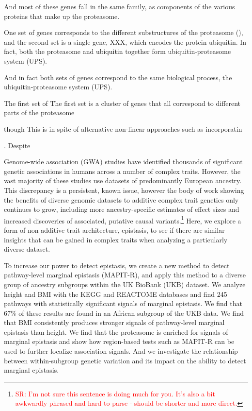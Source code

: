 \documentclass[12pt,a4paper]{article}
\newcommand{\red}[1]{\textcolor{red}{#1}}
\begin{document}
And most of these genes fall in the same family, as components of the various proteins that make up the proteasome. 

One set of genes corresponds to the different substructures of the proteasome (), and the second set is a single gene, XXX, which encodes the protein ubiquitin. In fact, both the proteasome and ubiquitin together form ubiquitin-proteasome system (UPS).



And in fact both sets of genes correspond to the same biological process, the ubiquitin-proteasome system (UPS).

The first set of The first set is a cluster of genes that all correspond to different parts of the proteasome







though  
This is in spite of alternative non-linear approaches such as incorporatin

. Despite 




Genome-wide association (GWA) studies have identified thousands of significant genetic associations in humans across a number of complex traits. However, the vast majority of these studies use datasets of predominantly European ancestry. This discrepancy is a persistent, known issue, however the body of work showing the benefits of diverse genomic datasets to additive complex trait genetics only continues to grow, including more ancestry-specific estimates of effect sizes and increased discoveries of associated, putative causal variants.\footnote{\red{SR: I'm not sure this sentence is doing much for you. It's also a bit awkwardly phrased and hard to parse - should be shorter and more direct.}} Here, we explore a form of non-additive trait architecture, epistasis, to see if there are similar insights that can be gained in complex traits when analyzing a particularly diverse dataset. 

To increase our power to detect epistasis, we create a new method to detect pathway-level marginal epistasis (MAPIT-R), and apply this method to a diverse group of ancestry subgroups within the UK BioBank (UKB) dataset. We analyze height and BMI with the KEGG and REACTOME databases and find 245 pathways with statistically significant signals of marginal epistasis. We find that 67\% of these results are found in an African subgroup of the UKB data. We find that BMI consistently produces stronger signals of pathway-level marginal epistasis than height. We find that the proteasome is enriched for signals of marginal epistasis and show how region-based tests such as MAPIT-R can be used to further localize association signals. And we investigate the relationship between within-subgroup genetic variation and its impact on the ability to detect marginal epistasis. 







\fi
\end{document}
